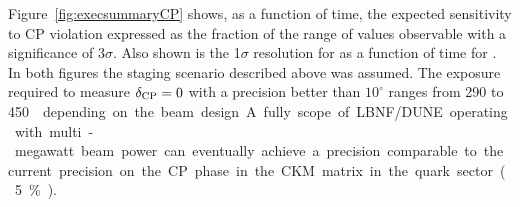 %
Figure~\ref{fig:execsummaryCP} shows, as a function of time, the expected sensitivity to CP
violation expressed as the fraction of the range of \deltacp values observable with a significance
of 3$\sigma$. Also shown is the 1$\sigma$ resolution for \deltacp as a
function of time for . In both figures the staging scenario described above was assumed.
 The exposure  required to measure
$\delta_{\rm CP} = 0 $ with a precision better than $10^\circ$ ranges
from 290 to \SI{450}\ktMWyr{} depending on the beam design.
A fully scope of LBNF/DUNE operating with multi-megawatt 
beam power can eventually achieve a precision 
comparable to the current precision on the CP phase in the
CKM matrix in the quark sector (5\%).

